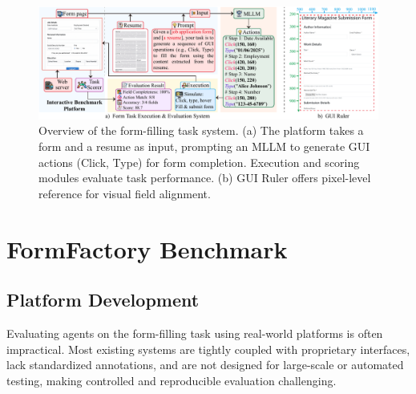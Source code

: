 \documentclass[sigconf, screen, review]{acmart}
\begin{document}





\begin{figure}[t]
    \centering
    \includegraphics[width=0.98\linewidth]{figs/overview.pdf}
    \caption{
    Overview of the form-filling task system. (a) The platform takes a form and a resume as input, prompting an MLLM to generate GUI actions (Click, Type) for form completion. Execution and scoring modules evaluate task performance. (b) GUI Ruler offers pixel-level reference for visual field alignment.}
    \label{fig:system}
\end{figure}

\section{FormFactory Benchmark}



\subsection{Platform Development}
Evaluating agents on the form-filling task using real-world platforms is often impractical.
Most existing systems are tightly coupled with proprietary interfaces, lack standardized annotations, and are not designed for large-scale or automated testing, making controlled and reproducible evaluation challenging.
\end{document}
